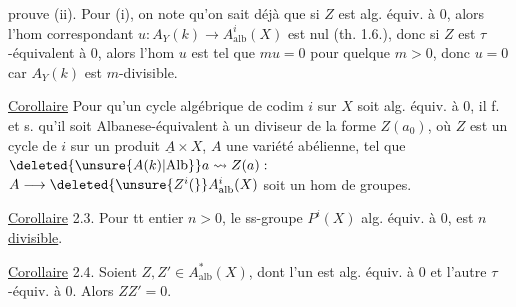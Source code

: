  prouve (ii). Pour (i), on note qu'on sait
déjà que si $Z$ est alg. équiv. à 0, alors
l'hom correspondant $u:A_Y(k)\longrightarrow A^i_{\mathrm{alb}}(X)$ est nul
(th. 1.6.), donc si $Z$ est $\tau$-équivalent à 0, alors
l'hom $u$ est tel que $mu=0$ pour quelque
$m>0$, donc $u=0$ car $A_Y(k)$ est $m$-divisible.

\uline{Corollaire}  Pour qu'un cycle algébrique
de codim $i$ sur $X$ soit alg. équiv. à 0, il
f. et s. qu'il soit Albanese-équivalent à
un diviseur de la forme $Z(a_0)$, où
 $Z$ est un cycle de  $i$
sur un  produit $\underline{A}\times X$, $A$ une
variété abélienne, tel que $\deleted{\unsure{A(k)|\mathrm{Alb}}}a\leadsto Z(a):$
$A\longrightarrow\deleted{\unsure{Z^i(}}A^i_{\mathrm{alb}}(X)$ soit un hom de
groupes.

\uline{Corollaire} 2.3. Pour tt entier $n>0$, le ss-groupe
$P^i(X)$   
alg. équiv. à 0, est $n$ \uline{divisible}.

\uline{Corollaire} 2.4. Soient $Z,Z'\in A^*_{\mathrm{alb}}(X)$, dont l'un est
alg. équiv. à 0 et l'autre $\tau$-équiv. à 0.
Alors $ZZ'=0$.
